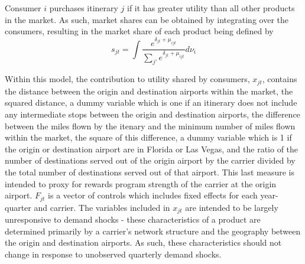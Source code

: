 \documentclass{article}
\begin{document}
	Consumer $i$ purchases itinerary $j$ if it has greater utility than all other products in the market. As such, market shares can be obtained by integrating over the consumers, resulting in the market share of each product being defined by \[s_{jt} = \int \frac{e^{\delta_{jt} + \mu_{ijt}}}{\sum_{j'} e^{\delta_{jt} + \mu_{ijt}}} d{\nu_{i}}\]
	
	Within this model, the contribution to utility shared by consumers, $x_{jt}$, contains the distance between the origin and destination airports within the market, the squared distance, a dummy variable which is one if an itinerary does not include any intermediate stops between the origin and destination airports, the difference between the miles flown by the itenary and the minimum number of miles flown within the market, the square of this difference, a dummy variable which is 1 if the origin or destination airport are in Florida or Las Vegas, and the ratio of the number of destinations served out of the origin airport by the carrier divided by the total number of destinations served out of that airport. This last measure is intended to proxy for rewards program strength of the carrier at the origin airport. $F_{jt}$ is a vector of controls which includes fixed effects for each year-quarter and carrier. The variables included in $x_{jt}$ are intended to be largely unresponsive to demand shocks - these characteristics of a product are determined primarily by a carrier's network structure and the geography between the origin and destination airports. As such, these characteristics should not change in response to unobserved quarterly demand shocks.
	
\end{document}
